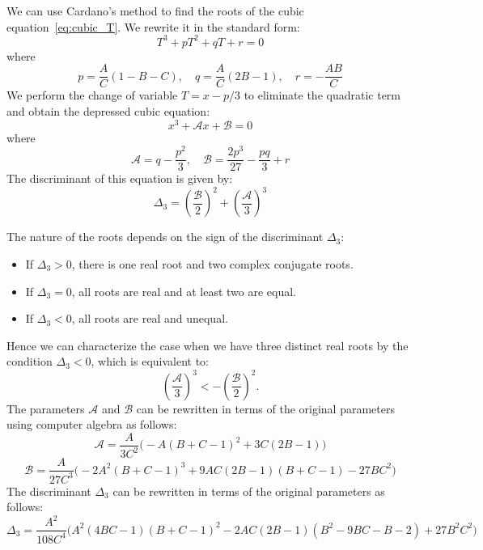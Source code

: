 \documentclass[a4paper, 12pt]{article}
\begin{document}

\par\noindent We can use Cardano's method to find the roots of the cubic equation~\eqref{eq:cubic_T}. We rewrite it in the standard form:
\[ T^3 + p T^2 + q T + r = 0
\]
where
\[ p = \frac{A}{C} \left(1- B- C \right), \quad
q = \frac{A}{C} \left(2 B -1 \right), \quad
r = -\frac{A B}{C}
\]
We perform the change of variable $T = x - p/3$ to eliminate the quadratic term and obtain the depressed cubic equation:
\[
x^3 + \mathcal{A} x + \mathcal{B} = 0
\]
where
\[
\mathcal{A} = q - \frac{p^2}{3}, \quad \mathcal{B} = \frac{2 p^3}{27} - \frac{p q}{3} + r
\]
The discriminant of this equation is given by:
\[
\Delta_3 = {\left(\frac{\mathcal{B}}{2}\right)}^2 + {\left(\frac{\mathcal{A}}{3}\right)}^3
\]

The nature of the roots depends on the sign of the discriminant $\Delta_3$:
\begin{itemize}
\item If $\Delta_3 > 0$, there is one real root and two complex conjugate roots.
\item If $\Delta_3 = 0$, all roots are real and at least two are equal.
\item If $\Delta_3 < 0$, all roots are real and unequal.
\end{itemize}
Hence we can characterize the case when we have three distinct real roots by the condition $\Delta_3 < 0$, which is equivalent to:
\[ {\left(\frac{\mathcal{A}}{3}\right)}^3 < - {\left(\frac{\mathcal{B}}{2}\right)}^2.
\]
The parameters $\mathcal{A}$ and $\mathcal{B}$ can be rewritten in terms of the original parameters  using computer algebra as follows:
\[
\mathcal{A}=\frac{A}{ 3 C^2} \Big(-A {(B + C - 1)}^2 + 3 C(2B - 1)\Big)
\]
\[
\mathcal{B}= \frac{A} {27 C^3} \Big(-2A^2 {(B + C - 1)}^3 + 9 A C (2 B - 1)(B + C - 1) - 27 B C^2\Big)
\]
The discriminant $\Delta_3$ can be rewritten in terms of the original parameters as follows:
\[
\Delta_3 = \frac{A^2} {108 C^4} \Bigg(A^2 (4BC-1) {(B + C - 1)}^2 - 2AC (2B-1)(B^2-9BC-B-2) + 27 B^2 C^2\Bigg)
\]
\par\noindent
\end{document}
